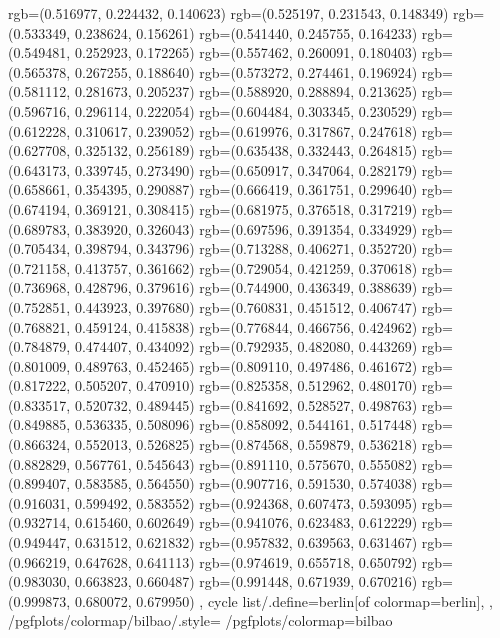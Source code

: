 {{{					rgb=(0.516977, 0.224432, 0.140623)
					rgb=(0.525197, 0.231543, 0.148349)
					rgb=(0.533349, 0.238624, 0.156261)
					rgb=(0.541440, 0.245755, 0.164233)
					rgb=(0.549481, 0.252923, 0.172265)
					rgb=(0.557462, 0.260091, 0.180403)
					rgb=(0.565378, 0.267255, 0.188640)
					rgb=(0.573272, 0.274461, 0.196924)
					rgb=(0.581112, 0.281673, 0.205237)
					rgb=(0.588920, 0.288894, 0.213625)
					rgb=(0.596716, 0.296114, 0.222054)
					rgb=(0.604484, 0.303345, 0.230529)
					rgb=(0.612228, 0.310617, 0.239052)
					rgb=(0.619976, 0.317867, 0.247618)
					rgb=(0.627708, 0.325132, 0.256189)
					rgb=(0.635438, 0.332443, 0.264815)
					rgb=(0.643173, 0.339745, 0.273490)
					rgb=(0.650917, 0.347064, 0.282179)
					rgb=(0.658661, 0.354395, 0.290887)
					rgb=(0.666419, 0.361751, 0.299640)
					rgb=(0.674194, 0.369121, 0.308415)
					rgb=(0.681975, 0.376518, 0.317219)
					rgb=(0.689783, 0.383920, 0.326043)
					rgb=(0.697596, 0.391354, 0.334929)
					rgb=(0.705434, 0.398794, 0.343796)
					rgb=(0.713288, 0.406271, 0.352720)
					rgb=(0.721158, 0.413757, 0.361662)
					rgb=(0.729054, 0.421259, 0.370618)
					rgb=(0.736968, 0.428796, 0.379616)
					rgb=(0.744900, 0.436349, 0.388639)
					rgb=(0.752851, 0.443923, 0.397680)
					rgb=(0.760831, 0.451512, 0.406747)
					rgb=(0.768821, 0.459124, 0.415838)
					rgb=(0.776844, 0.466756, 0.424962)
					rgb=(0.784879, 0.474407, 0.434092)
					rgb=(0.792935, 0.482080, 0.443269)
					rgb=(0.801009, 0.489763, 0.452465)
					rgb=(0.809110, 0.497486, 0.461672)
					rgb=(0.817222, 0.505207, 0.470910)
					rgb=(0.825358, 0.512962, 0.480170)
					rgb=(0.833517, 0.520732, 0.489445)
					rgb=(0.841692, 0.528527, 0.498763)
					rgb=(0.849885, 0.536335, 0.508096)
					rgb=(0.858092, 0.544161, 0.517448)
					rgb=(0.866324, 0.552013, 0.526825)
					rgb=(0.874568, 0.559879, 0.536218)
					rgb=(0.882829, 0.567761, 0.545643)
					rgb=(0.891110, 0.575670, 0.555082)
					rgb=(0.899407, 0.583585, 0.564550)
					rgb=(0.907716, 0.591530, 0.574038)
					rgb=(0.916031, 0.599492, 0.583552)
					rgb=(0.924368, 0.607473, 0.593095)
					rgb=(0.932714, 0.615460, 0.602649)
					rgb=(0.941076, 0.623483, 0.612229)
					rgb=(0.949447, 0.631512, 0.621832)
					rgb=(0.957832, 0.639563, 0.631467)
					rgb=(0.966219, 0.647628, 0.641113)
					rgb=(0.974619, 0.655718, 0.650792)
					rgb=(0.983030, 0.663823, 0.660487)
					rgb=(0.991448, 0.671939, 0.670216)
					rgb=(0.999873, 0.680072, 0.679950)
			},
		cycle list/.define={berlin}{[of colormap=berlin]},
		},
		/pgfplots/colormap/bilbao/.style={
			/pgfplots/colormap={bilbao}{%
}}}
